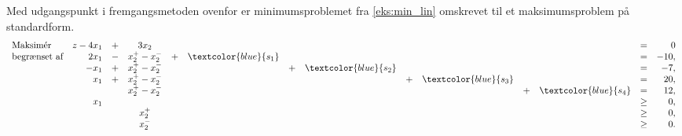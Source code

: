 %
\begin{eks}
Med udgangspunkt i fremgangsmetoden ovenfor er minimumsproblemet fra \ref{eks:min_lin} omskrevet til et maksimumsproblem på standardform.
%
\begin{align*}
\begin{array}{lrcccrcrcrcrcrcr}
\text{Maksimér}		&z-4x_1 &+& 3x_2& & & & & & & & & = & 0\\
\text{begrænset af}	&2x_1	&-	&x_2^+-x_2^-		&+	&\textcolor{blue}{s_1}&	&	&	&	&	&	&= 		&-10,\\
					&-x_1	&+	&x_2^+-x_2^-		&	&	&+	&\textcolor{blue}{s_2} &	&	&	&	&=		& -7,\\
					&x_1	&+	&x_2^+-x_2^-		&	&	&	&	&+	&\textcolor{blue}{s_3}&	&	&=		& 20,\\
					& 		&	&x_2^+-x_2^-&	&	&	&	&	&	&+	&\textcolor{blue}{s_4} &=		& 12,\\
					&x_1	&	&			&	&	&	&	&	&	&	&	&\geq	& 0,\\
					&		&	&x_2^+	&	&	&	&	&	&	&	&	&\geq	& 0,\\
					&		&	&x_2^-	&	&	&	&	&	&	&	&	&\geq	& 0.\\
\end{array}
\end{align*}
\end{eks}